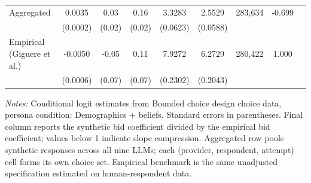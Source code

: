 \begin{table}[h]
{\begin{threeparttable}
\begin{tabular}{lcccccccr}
\midrule
Aggregated &    0.0035 &      0.03 &      0.16 &    3.3283 &    2.5529 &   283,634 & -0.699 \\
 & (0.0002) & (0.02) & (0.02) & (0.0623) & (0.0588) & & \\
\midrule
Empirical (Giguere et al.) &   -0.0050 &     -0.05 &      0.11 &    7.9272 &    6.2729 &   280,422 & 1.000 \\
 & (0.0006) & (0.07) & (0.07) & (0.2302) & (0.2043) & & \\
\bottomrule
\end{tabular}
\begin{tablenotes}\footnotesize
\item \textit{Notes:} Conditional logit estimates from Bounded choice design choice data, persona condition: Demographics + beliefs. 
Standard errors in parentheses. 
Final column reports the synthetic bid coefficient divided by the empirical bid coefficient; values below 1 indicate slope compression. 
Aggregated row pools synthetic responses across all nine LLMs; each (provider, respondent, attempt) cell forms its own choice set. 
Empirical benchmark is the same unadjusted specification estimated on \textcite{Giguere2020} human-respondent data.
\end{tablenotes}
\end{threeparttable}
}
\end{table}
